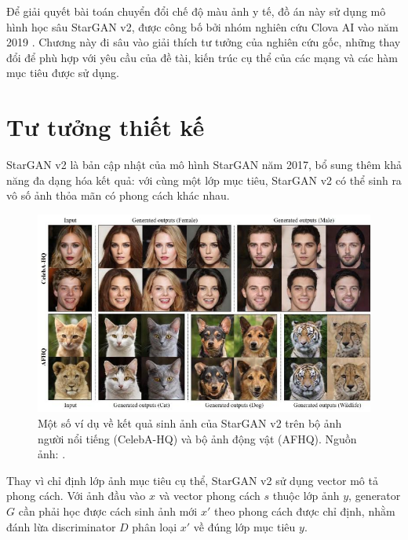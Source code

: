 \documentclass[12pt]{extreport}
\begin{document}
Để giải quyết bài toán chuyển đổi chế độ màu ảnh y tế, đồ án này sử dụng mô hình học sâu StarGAN v2, được công bố bởi nhóm nghiên cứu Clova AI vào năm 2019 \cite{choi2020stargan}. Chương này đi sâu vào giải thích tư tưởng của nghiên cứu gốc, những thay đổi để phù hợp với yêu cầu của đề tài, kiến trúc cụ thể của các mạng và các hàm mục tiêu được sử dụng.

\section{Tư tưởng thiết kế}

StarGAN v2 là bản cập nhật của mô hình StarGAN năm 2017, bổ sung thêm khả năng đa dạng hóa kết quả: với cùng một lớp mục tiêu, StarGAN v2 có thể sinh ra vô số ảnh thỏa mãn có phong cách khác nhau.

\begin{figure}[H]
    \centering
    \includegraphics[width=\linewidth]{figure22.jpg}
    \caption{Một số ví dụ về kết quả sinh ảnh của StarGAN v2 trên bộ ảnh người nổi tiếng (CelebA-HQ) và bộ ảnh động vật (AFHQ). Nguồn ảnh: \cite{choi2020stargan}.}
\end{figure}

Thay vì chỉ định lớp ảnh mục tiêu cụ thể, StarGAN v2 sử dụng vector mô tả phong cách. Với ảnh đầu vào $ x $ và vector phong cách $ s $ thuộc lớp ảnh $ y $, generator $ G $ cần phải học được cách sinh ảnh mới $ x' $ theo phong cách được chỉ định, nhằm đánh lừa discriminator $ D $ phân loại $ x' $ về đúng lớp mục tiêu $ y $.
\end{document}
